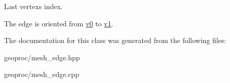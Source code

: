 Last vertex\textquotesingle{}s index. 

The edge is oriented from \hyperlink{classgeoproc_1_1mesh__edge_a1d4e25142bb7580c91fad0b74916f1ec}{v0} to \hyperlink{classgeoproc_1_1mesh__edge_a841e7dc084b54f0abaa6f52b10343e8d}{v1}. 

The documentation for this class was generated from the following files\+:\begin{DoxyCompactItemize}
\item 
geoproc/mesh\+\_\+edge.\+hpp\item 
geoproc/mesh\+\_\+edge.\+cpp\end{DoxyCompactItemize}
